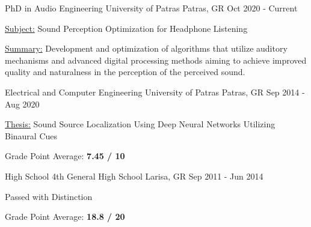 

\begin{cventries}

  \cventry
    {PhD in Audio Engineering} %
    {University of Patras} %
    {Patras, GR} %
    {Oct 2020 - Current} %
    {
      \begin{cvitems} %
        \item {\underline{Subject:} Sound Perception Optimization for Headphone Listening}
        \item {\underline{Summary:} Development and optimization of algorithms that utilize auditory mechanisms and advanced digital processing methods aiming to achieve improved quality and naturalness in the perception of the perceived sound.}
      \end{cvitems}
    }

  \cventry
    {Electrical and Computer Engineering} %
    {University of Patras} %
    {Patras, GR} %
    {Sep 2014 - Aug 2020} %
    {
      \begin{cvitems} %
        \item {\underline{Thesis:} Sound Source Localization Using Deep Neural Networks Utilizing Binaural Cues}
        \item {Grade Point Average: \textbf{7.45 / 10}}
      \end{cvitems}
    }

  \cventry
    {High School} %
    {4th General High School} %
    {Larisa, GR} %
    {Sep 2011 - Jun 2014} %
    {
      \begin{cvitems} %
        \item {Passed with Distinction}
        \item {Grade Point Average: \textbf{18.8 / 20}}
      \end{cvitems}
    }
\end{cventries}
